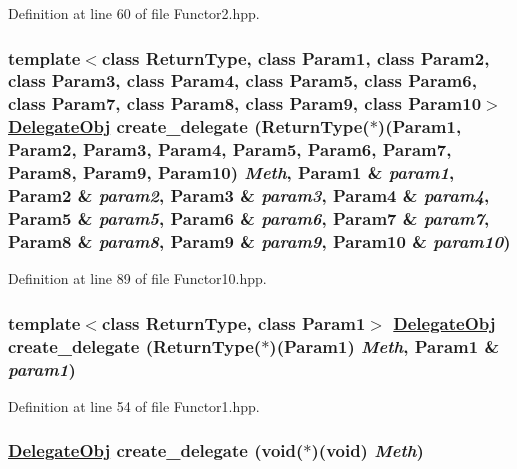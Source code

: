 Definition at line 60 of file Functor2.hpp.\hypertarget{namespaceDL_a25}{
\subsubsection[create\_\-delegate]{\setlength{\rightskip}{0pt plus 5cm}template$<$class Return\-Type, class Param1, class Param2, class Param3, class Param4, class Param5, class Param6, class Param7, class Param8, class Param9, class Param10$>$ \hyperlink{namespaceDL_a0}{Delegate\-Obj} create\_\-delegate (Return\-Type($\ast$)(Param1, Param2, Param3, Param4, Param5, Param6, Param7, Param8, Param9, Param10) {\em Meth}, Param1 \& {\em param1}, Param2 \& {\em param2}, Param3 \& {\em param3}, Param4 \& {\em param4}, Param5 \& {\em param5}, Param6 \& {\em param6}, Param7 \& {\em param7}, Param8 \& {\em param8}, Param9 \& {\em param9}, Param10 \& {\em param10})}}
\label{namespaceDL_a25}




Definition at line 89 of file Functor10.hpp.\hypertarget{namespaceDL_a24}{
\subsubsection[create\_\-delegate]{\setlength{\rightskip}{0pt plus 5cm}template$<$class Return\-Type, class Param1$>$ \hyperlink{namespaceDL_a0}{Delegate\-Obj} create\_\-delegate (Return\-Type($\ast$)(Param1) {\em Meth}, Param1 \& {\em param1})}}
\label{namespaceDL_a24}




Definition at line 54 of file Functor1.hpp.\hypertarget{namespaceDL_a23}{
\subsubsection[create\_\-delegate]{\setlength{\rightskip}{0pt plus 5cm}\hyperlink{namespaceDL_a0}{Delegate\-Obj} create\_\-delegate (void($\ast$)(void) {\em Meth})}}
\label{namespaceDL_a23}




